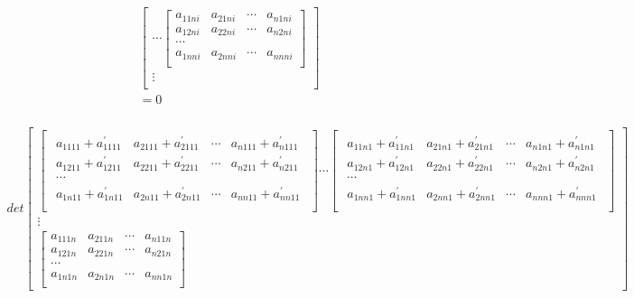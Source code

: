 \documentclass[twoside,a4paper,CCT]{cctart}   %
\begin{document}
\begin{list}{}
\begin{align*}
\begin{bmatrix}
\cdots
\begin{bmatrix}
  a_{11ni}& a_{21ni}&\cdots&a_{n1ni}\\
  a_{12ni}& a_{22ni}&\cdots&a_{n2ni}\\
   \cdots\\
   a_{1nni }& a_{2nni}&\cdots&a_{nnni}\\
   \end{bmatrix}\\
\vdots\\
    \end{bmatrix}\\
=0\\
\end{align*}

 \item
\begin{align*}
 det\begin{bmatrix}
 \begin{bmatrix}\begin{smallmatrix}
 a_{1111} + a_{1111}^{'}& a_{2111} + a_{2111}^{'}&\cdots&a_{n111} + a_{n111}^{'}\\
 a_{1211} + a_{1211}^{'}& a_{2211} + a_{2211}^{'}&\cdots&a_{n211} + a_{n211}^{'}\\
 \cdots\\
a_{1n11} + a_{1n11}^{'}& a_{2n11} + a_{2n11}^{'}&\cdots&a_{nn11} + a_{nn11}^{'}\\
\end{smallmatrix}\end{bmatrix}
\cdots
\begin{bmatrix}\begin{smallmatrix}
  a_{11n1} + a_{11n1}^{'}& a_{21n1} + a_{21n1}^{'}&\cdots&a_{n1n1} + a_{n1n1}^{'}\\
a_{12n1} + a_{12n1}^{'}& a_{22n1} + a_{22n1}^{'}&\cdots&a_{n2n1} + a_{n2n1}^{'}\\
 \cdots\\
 a_{1nn1} + a_{1nn1}^{'}& a_{2nn1} + a_{2nn1}^{'}&\cdots&a_{nnn1} + a_{nnn1}^{'}\\
 \end{smallmatrix}\end{bmatrix}\\
\vdots\\
\begin{bmatrix}
  a_{111n}& a_{211n}&\cdots&a_{n11n}\\
  a_{121n}& a_{221n}&\cdots&a_{n21n}\\
  \cdots\\
  a_{1n1n}& a_{2n1n}&\cdots&a_{nn1n}\\

\end{bmatrix}
\end{bmatrix}
\end{align*}
\end{list}
\end{document}
